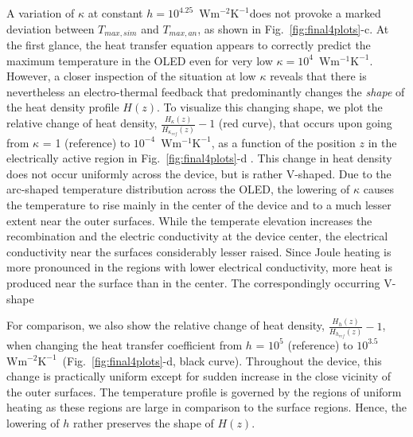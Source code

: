 \documentclass[%
9pt,
 aip,
rsi,%
 amsmath,amssymb,
preprint,%
]{revtex4-1}
\newcommand{\thermalconductivity}{$\mathrm{W m^{-1} K^{-1}}$}
\newcommand{\hcoefficient}{$\mathrm{W m^{-2} K^{-1}}$}
\begin{document}
A variation of $\kappa$ at constant $h = 10^{4.25}$~\hcoefficient does not provoke a marked deviation between $T_{max,sim}$ and $T_{max,an}$, as shown in Fig.~\ref{fig:final4plots}-c.
At the first glance, the heat transfer equation appears to correctly predict the maximum temperature in the OLED even for very low $\kappa = 10^4$~\thermalconductivity.
However, a closer inspection of the situation at low $\kappa$ reveals that there is nevertheless an electro-thermal feedback that predominantly changes the \textit{shape} of the heat density profile $H(z)$.
To visualize this changing shape, we plot the relative change of heat density, $\frac{H_{\kappa}(z)}{H_{\kappa_{ref}}(z)}-1$ (red curve), that occurs upon going from $\kappa$ = 1 (reference) to $10^{-4}$~\thermalconductivity, as a function of the position $z$ in the electrically active region in Fig.~\ref{fig:final4plots}-d .
%
This change in heat density does not occur uniformly across the device, but is rather V-shaped.
Due to the arc-shaped temperature distribution across the OLED, the lowering of $\kappa$ causes the temperature to rise mainly in the center of the device and to a much lesser extent near the outer surfaces. 
While the temperate elevation increases the recombination and the electric conductivity at the device center, the electrical conductivity near the surfaces considerably lesser raised.
Since Joule heating is more pronounced in the regions with lower electrical conductivity, more heat is produced near the surface than in the center.
The correspondingly occurring V-shape  

For comparison, we also show the relative change of heat density, $\frac{H_{h}(z)}{H_{h_{ref}}(z)}-1$, when changing the heat transfer coefficient from $h$ = $10^{5}$ (reference) to $10^{3.5}$~\hcoefficient~(Fig.~\ref{fig:final4plots}-d, black curve).
Throughout the device, this change is practically uniform except for sudden increase in the close vicinity of the outer surfaces. 
The temperature profile is governed by the regions of uniform heating as these regions are large in comparison to the surface regions.
Hence, the lowering of $h$ rather preserves the shape of $H(z)$.
\end{document}
